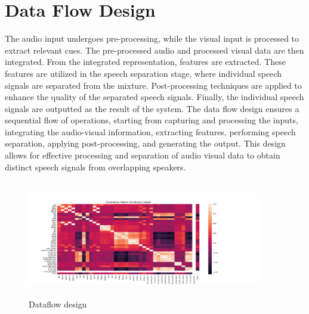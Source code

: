 \documentclass[12pt,a4paper]{report}
\begin{document}
\section{Data Flow Design}
\par
The audio input undergoes pre-processing, while the visual input is processed to extract relevant cues. The pre-processed audio and processed visual data are then integrated. From the integrated representation, features are extracted. These features are utilized in the speech separation stage, where individual speech signals are separated from the mixture. Post-processing techniques are applied to enhance the quality of the separated speech signals. Finally, the individual speech signals are outputted as the result of the system. The data flow design ensures a sequential flow of operations, starting from capturing and processing the inputs, integrating the audio-visual information, extracting features, performing speech separation, applying post-processing, and generating the output. This design allows for effective processing and separation of audio visual data to obtain distinct speech signals from overlapping speakers.
\\
\begin{figure}[hbtp]
\centering
\includegraphics[width=4in,height=2in]{pic/correlation_matrix_bin.png}
\caption{Dataflow design}
\end{figure}



\newpage
\end{document}

